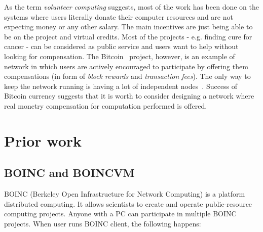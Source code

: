 \begin{comment}
bitcoiny tutaj
Nakamoto2008_bitcoin.pdf

jak bardzo ogolnikowo pisac?
- nagrody (coraz mniejsze)
- 51\%

\end{comment}

As the term \emph{volunteer computing} suggests, most of the work has been done on the systems where users literally donate their computer resources and are not expecting money or any other salary. The main incentives are just being able to be on the project and virtual credits. Most of the projects - e.g. finding cure for cancer - can be considered as public service and users want to help without looking for compensation. The Bitcoin~\cite{nakamoto2008bitcoin} project, however, is an example of network in which users are actively encouraged to participate by offering them compensations (in form of \emph{block rewards} and \emph{transaction fees}). The only way to keep the network running is having a lot of independent nodes~\cite{barber2012bitter}. Success of Bitcoin currency suggests that it is worth to consider designing a network where real monetry compensation for computation performed is offered.

\begin{comment}

podsumowanie volunteer:
- uczestnicza nieodplatnie, kiedy podoba im sie projekt albo za wirtualne credits
- wykorzystywany przez uczelnie bez sprzetu i pieniedzy

\end{comment}

\section{Prior work}

\subsection{BOINC and BOINCVM}

\begin{comment}
dodać boincowe obrazki, screenshoty
\end{comment}

BOINC (Berkeley Open Infrastructure for Network Computing) is a platform distributed computing. It allows scientists to create and operate public-resource computing projects. Anyone with a PC can participate in multiple BOINC projects. When user runs BOINC client, the following happens:

